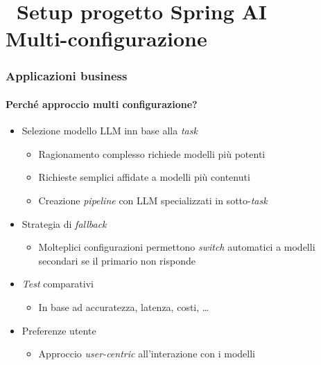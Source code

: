 \section{\faWrench\ Setup progetto Spring AI\\{\small Multi-configurazione}} %
\label{sec:spring-ai-project-setup}
%
\begin{frame}[t,fragile] \frametitle{Applicazioni business}
    \framesubtitle{Perché approccio multi configurazione?}
    \begin{itemize}[leftmargin=10pt,align=right]
        \item[\alert{\faArrowCircleRight}] Selezione modello LLM inn base alla \textit{task}
        \begin{itemize}[leftmargin=10pt,align=right]
            \item[\alert{\faArrowCircleRight}] Ragionamento complesso richiede modelli più potenti
            \item[\alert{\faArrowCircleRight}] Richieste semplici affidate a modelli più contenuti
            \item[\alert{\faArrowCircleRight}] Creazione \textit{pipeline} con LLM specializzati in sotto-\textit{task}
        \end{itemize}
        \item[\alert{\faArrowCircleRight}] Strategia di \textit{fallback}
        \begin{itemize}[leftmargin=10pt,align=right]
            \item[\alert{\faArrowCircleRight}] Molteplici configurazioni permettono \textit{switch} automatici a modelli secondari se il primario non risponde
        \end{itemize}
        \item[\alert{\faArrowCircleRight}] \textit{Test} comparativi
        \begin{itemize}[leftmargin=10pt,align=right]
            \item[\alert{\faArrowCircleRight}] In base ad accuratezza, latenza, costi, \ldots
        \end{itemize}
        \item[\alert{\faArrowCircleRight}] Preferenze utente
        \begin{itemize}[leftmargin=10pt,align=right]
            \item[\alert{\faArrowCircleRight}] Approccio \textit{user-centric} all'interazione con i modelli
        \end{itemize}
\end{itemize}
\end{frame}
%

